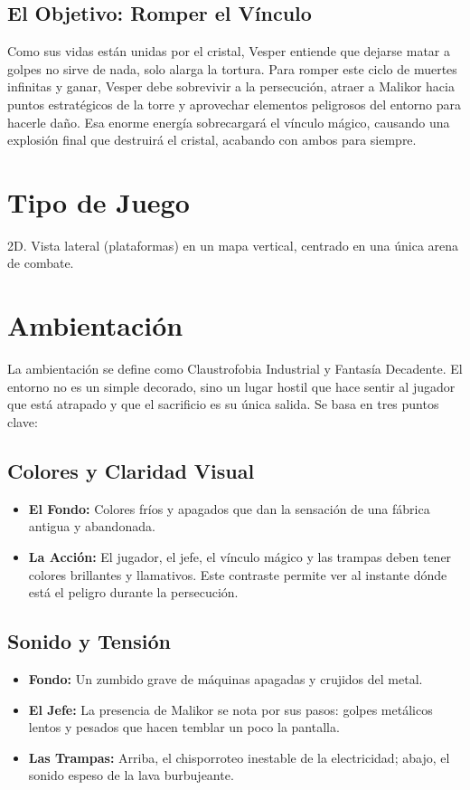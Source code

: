 \documentclass[11pt,a4paper]{article}
\begin{document}
\subsection*{El Objetivo: Romper el Vínculo}
Como sus vidas están unidas por el cristal, Vesper entiende que dejarse matar a golpes no sirve de nada, solo alarga la tortura. Para romper este ciclo de muertes infinitas y ganar, Vesper debe sobrevivir a la persecución, atraer a Malikor hacia puntos estratégicos de la torre y aprovechar elementos peligrosos del entorno para hacerle daño. Esa enorme energía sobrecargará el vínculo mágico, causando una explosión final que destruirá el cristal, acabando con ambos para siempre.

\section*{Tipo de Juego}
2D. Vista lateral (plataformas) en un mapa vertical, centrado en una única arena de combate.

\section*{Ambientación}
La ambientación se define como Claustrofobia Industrial y Fantasía Decadente. El entorno no es un simple decorado, sino un lugar hostil que hace sentir al jugador que está atrapado y que el sacrificio es su única salida. Se basa en tres puntos clave:

\subsection*{Colores y Claridad Visual}
\begin{itemize}
    \item \textbf{El Fondo:} Colores fríos y apagados que dan la sensación de una fábrica antigua y abandonada.
    \item \textbf{La Acción:} El jugador, el jefe, el vínculo mágico y las trampas deben tener colores brillantes y llamativos. Este contraste permite ver al instante dónde está el peligro durante la persecución.
\end{itemize}

\subsection*{Sonido y Tensión}
\begin{itemize}
    \item \textbf{Fondo:} Un zumbido grave de máquinas apagadas y crujidos del metal.
    \item \textbf{El Jefe:} La presencia de Malikor se nota por sus pasos: golpes metálicos lentos y pesados que hacen temblar un poco la pantalla.
    \item \textbf{Las Trampas:} Arriba, el chisporroteo inestable de la electricidad; abajo, el sonido espeso de la lava burbujeante.
\end{itemize}
\end{document}
